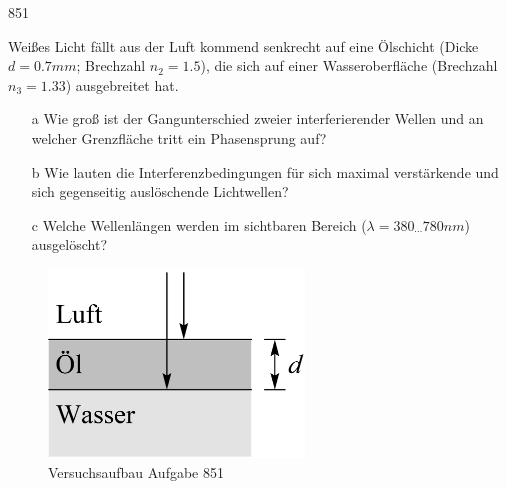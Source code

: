 \begin{auf}
    851
\end{auf}
Weißes Licht fällt aus der Luft kommend senkrecht auf eine Ölschicht (Dicke $d=0.7mm$; Brechzahl $n_2=1.5$), die sich auf einer Wasseroberfläche (Brechzahl $n_3=1.33$) ausgebreitet hat.
\begin{enumerate}
    \item[a] Wie groß ist der Gangunterschied zweier interferierender Wellen und an welcher	Grenzfläche tritt ein Phasensprung auf?
    \item[b] Wie lauten die Interferenzbedingungen für sich maximal verstärkende und sich gegenseitig auslöschende Lichtwellen?
    \item[c] Welche Wellenlängen werden im sichtbaren Bereich ($\lambda=380_{\cdots}780nm$) ausgelöscht?
\end{enumerate}
\begin{figure}[h]
    \centering
    \includegraphics[height=5cm]{images/851_0.png}
    \caption{Versuchsaufbau Aufgabe 851}
\end{figure}